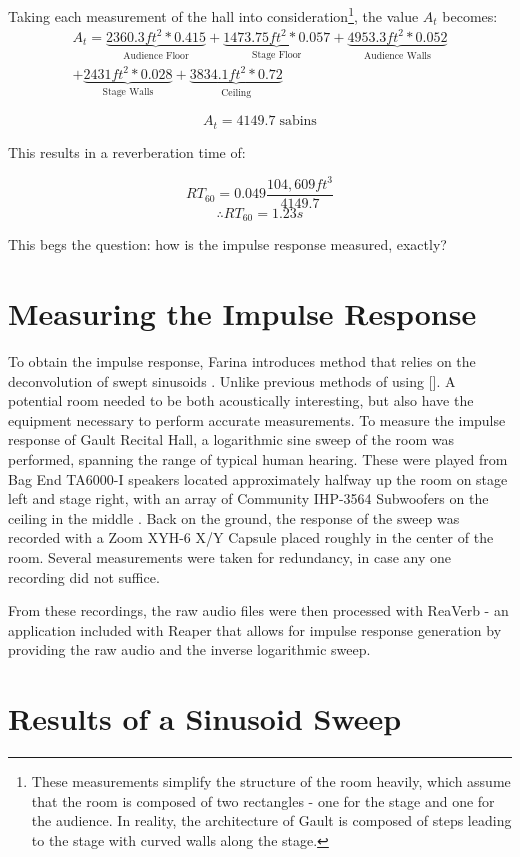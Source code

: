 Taking each measurement of the hall into consideration\footnote{These measurements simplify the structure of the room heavily, which assume that the room is composed of two rectangles - one for the stage and one for the audience. In reality, the architecture of Gault is composed of steps leading to the stage with curved walls along the stage.}, the value $A_t$ becomes:
\begin{multline}
 A_t =
	\underbrace{2360.3 ft^2 * 0.415}_\text{Audience Floor} + \underbrace{1473.75 ft^2 * 0.057}_{\text{Stage Floor}} +
	\underbrace{4953.3 ft^2 * 0.052}_\text{Audience Walls} \\ + \underbrace{2431 ft^2 * 0.028}_{\text{Stage Walls}} +
	\underbrace{3834.1 ft^2 * 0.72}_\text{Ceiling}
\end{multline}

\begin{equation}
  A_t = 4149.7 \; \text{sabins}
\end{equation}

This results in a reverberation time of:

\begin{equation}
 RT_{60} = 0.049 \frac{104,609 ft^3}{4149.7}
\end{equation}
\begin{equation}
 \therefore RT_{60} = 1.23s
\end{equation}

This begs the question: how is the impulse response measured, exactly?

\section{Measuring the Impulse Response}
To obtain the impulse response, Farina introduces method that relies on the deconvolution of swept sinusoids \cite{farina2000simultaneous}. Unlike previous methods of using []. A potential room needed to be both acoustically interesting, but also have the equipment necessary to perform accurate measurements. To measure the impulse response of Gault Recital Hall, a logarithmic sine sweep of the room was performed, spanning the range of typical human hearing. These were played from Bag End TA6000-I speakers located approximately halfway up the room on stage left and stage right, with an array of Community IHP-3564 Subwoofers on the ceiling in the middle \cite{woosound}. Back on the ground, the response of the sweep was recorded with a Zoom XYH-6 X/Y Capsule placed roughly in the center of the room. Several measurements were taken for redundancy, in case any one recording did not suffice.

From these recordings, the raw audio files were then processed with ReaVerb - an application included with Reaper that allows for impulse response generation by providing the raw audio and the inverse logarithmic sweep.

\section{Results of a Sinusoid Sweep}
